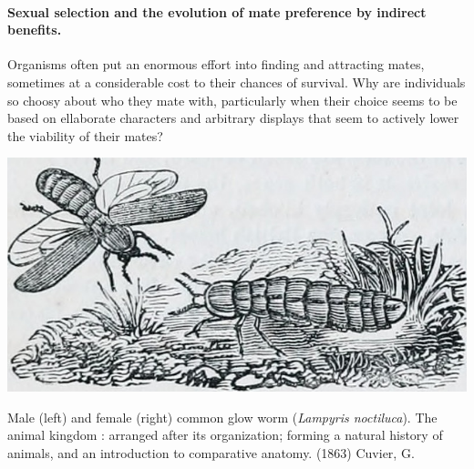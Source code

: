 

\paragraph{Sexual selection and the evolution of mate preference by indirect benefits. }


Organisms often put an enormous effort into finding and attracting mates, sometimes at
a considerable cost to their chances of survival. Why are individuals
so choosy about who they mate with, particularly when their choice
seems to be based on ellaborate characters and arbitrary displays
that seem to actively lower the viability of their mates?  

\begin{marginfigure}
\begin{center}
\includegraphics[width= \textwidth]{illustration_images/Quant_gen/glow_worm/18011950889_b2a1a1323e_z.jpg}
\end{center}
\caption{Male (left) and female (right) common glow worm  ({\it Lampyris
    noctiluca}). The animal kingdom : arranged after its organization;
  forming a natural history of animals, and an introduction to
  comparative anatomy. (1863) Cuvier, G. } \label{fig:glow_worms}
\end{marginfigure}

